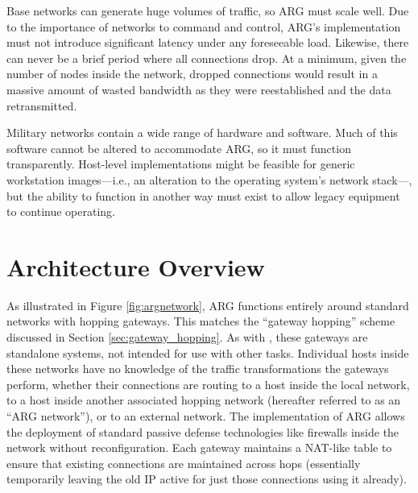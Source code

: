 \par Base networks can generate huge volumes of traffic, so ARG must scale well. Due to the importance of networks to command and control, ARG's implementation must not introduce significant latency under any foreseeable load. Likewise, there can never be a brief period where all connections drop. At a minimum, given the number of nodes inside the network, dropped connections would result in a massive amount of wasted bandwidth as they were reestablished and the data retransmitted.

\par Military networks contain a wide range of hardware and software. Much of this software cannot be altered to accommodate \ac{ARG}, so it must function transparently. Host-level implementations might be feasible for generic workstation images---i.e., an alteration to the operating system's network stack---, but the ability to function in another way must exist to allow legacy equipment to continue operating.


\section{Architecture Overview}
\label{sec:arg_impl_overview}

\par As illustrated in Figure \ref{fig:argnetwork}, \ac{ARG} functions entirely around standard networks with hopping gateways. This matches the ``gateway hopping'' scheme discussed in Section \ref{sec:gateway_hopping}. As with \cite{TAO}, these gateways are standalone systems, not intended for use with other tasks. Individual hosts inside these networks have no knowledge of the traffic transformations the gateways perform, whether their connections are routing to a host inside the local network, to a host inside another associated hopping network (hereafter referred to as an ``ARG network''), or to an external network. The implementation of ARG allows the deployment of standard passive defense technologies like firewalls inside the network without reconfiguration. Each gateway maintains a \ac{NAT}-like table to ensure that existing connections are maintained across hops (essentially temporarily leaving the old IP active for just those connections using it already).

